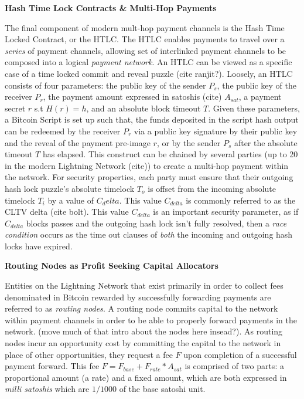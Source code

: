 \documentclass[12pt,a4paper]{article}
\theoremstyle{definition}
\begin{document}
\begin{center}
\textbf{Hash Time Lock Contracts \& Multi-Hop Payments}
\end{center}


The final component of modern mult-hop payment channels is the Hash Time Locked
Contract, or the HTLC. The HTLC enables payments to travel over a \emph{series}
of payment channels, allowing set of interlinked payment channels to be
composed into a logical \emph{payment network}. An HTLC can be viewed as a
specific case of a time locked commit and reveal puzzle (cite ranjit?).
Loosely, an HTLC consists of four parameters: the public key of the sender
$P_{s}$, the public key of the receiver $P_{r}$, the payment amount expressed
in satoshis (cite) $A_{sat}$, a payment secret $r$ s.t $H(r) = h$, and an
absolute block timeout $T$. Given these parameters, a Bitcoin Script is set up
such that, the funds deposited in the script hash output can be redeemed by the
receiver $P_{r}$ via a public key signature by their public key and the reveal
of the payment pre-image $r$, or by the sender $P_{s}$ after the absolute
timeout $T$ has elapsed. This construct can be chained by several parties (up
to 20 in the modern Lightning Network (cite)) to create a multi-hop payment
within the network. For security properties, each party must ensure that their
outgoing hash lock puzzle's absolute timelock $T_o$ is offset from the incoming
absolute timelock $T_i$ by a value of $C_delta$. This value $C_{delta}$ is
commonly referred to as the CLTV delta (cite bolt). This value $C_{delta}$ is
an important security parameter, as if $C_{delta}$ blocks passes and the
outgoing hash lock isn't fully resolved, then a \emph{race condition} occurs as
the time out clauses of \emph{both} the incoming and outgoing hash locks have
expired. \\

\begin{center}
\textbf{Routing Nodes as Profit Seeking Capital Allocators}
\end{center}

Entities on the Lightning Network that exist primarily in order to collect fees
denominated in Bitcoin rewarded by successfully forwarding payments are
referred to as \emph{routing nodes}. A routing node commits capital to the
network within payment channels in order to be able to properly forward
payments in the network. (move much of that intro about the nodes here
insead?). As routing nodes incur an opportunity cost by committing the capital
to the network in place of other opportunities, they request a fee $F$ upon
completion of a successful payment forward. This fee $F = F_{base} +
F_{rate}*A_{sat}$ is comprised of two parts: a proportional amount (a rate) and
a fixed amount, which are both expressed in \emph{milli satoshis} which are
$1/1000$ of the base satoshi unit.
\end{document}
